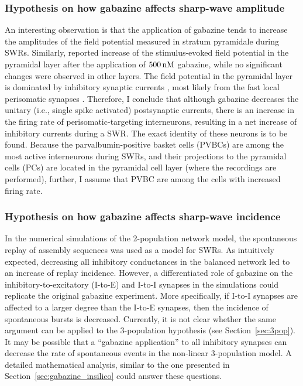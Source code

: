     \subsubsection{Hypothesis on how gabazine affects sharp-wave amplitude} 
      An interesting observation is that the application of gabazine tends to
      increase the amplitudes of the field potential measured in stratum
      pyramidale during SWRs. Similarly, \cite{Steidl2006} reported increase of
      the stimulus-evoked field potential in the pyramidal layer after the
      application of $500\,\rm nM$ gabazine, while no significant changes were
      observed in other layers. The field potential in the pyramidal layer is
      dominated by inhibitory synaptic currents \citep{Schonberger2014}, most
      likely from the fast local perisomatic synapses \citep{Ylinen1995}.
      Therefore, I conclude that although gabazine decreases the unitary (i.e.,
      single spike activated) postsynaptic currents, there is an increase in
      the firing rate of perisomatic-targeting interneurons, resulting in a net
      increase of inhibitory currents during a SWR. The exact identity of these
      neurons is to be found. Because the parvalbumin-positive basket cells
      (PVBCs) are among the most active interneurons during SWRs, and their
      projections to the pyramidal cells (PCs) are located in the pyramidal
      cell layer (where the recordings are performed), further, I assume that
      PVBC are among the cells with increased firing rate.

    \subsubsection{Hypothesis on how gabazine affects sharp-wave incidence} 
      In the numerical simulations of the 2-population network model, the
      spontaneous replay of assembly sequences was used as a model for SWRs. As
      intuitively expected, decreasing all inhibitory conductances in the
      balanced network led to an increase of replay incidence. However, a
      differentiated role of gabazine on the inhibitory-to-excitatory (I-to-E)
      and I-to-I synapses in the simulations could replicate the original
      gabazine experiment. More specifically, if I-to-I synapses are affected
      to a larger degree than the I-to-E synapses, then the incidence of
      spontaneous bursts is decreased. Currently, it is not clear whether the
      same argument can be applied to the 3-population hypothesis (see
      Section~\ref{sec:3pop}). It may be possible that a ``gabazine application''
      to all inhibitory synapses can decrease the rate of spontaneous events in
      the non-linear 3-population model. A detailed mathematical analysis,
      similar to the one presented in Section~\ref{sec:gabazine_insilico} could
      answer these questions.

